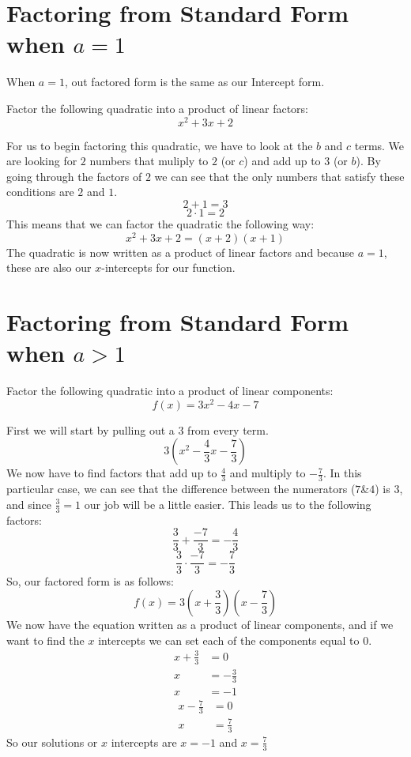 \documentclass{ximera}
\begin{document}
\section{Factoring from Standard Form when $a=1$}
When $a=1$, out factored form is the same as our Intercept form.

\begin{example}
Factor the following quadratic into a product of linear factors:
\[
x^2+3x+2
\]

\begin{explanation}
For us to begin factoring this quadratic, we have to look at the $b$ and $c$ terms. We are looking for $2$ numbers that muliply to $2$ (or $c$) and add up to $3$ (or $b$). By going through the factors of $2$ we can see that the only numbers that satisfy these conditions are $2$ and $1$.
\[
2+1=3
\]
\[
2\cdot 1=2
\]
This means that we can factor the quadratic the following way:
\[
x^2+3x+2=(x+2)(x+1)
\]
The quadratic is now written as a product of linear factors and because $a=1$, these are also our $x$-intercepts for our function.
\end{explanation}
\end{example}

\section{Factoring from Standard Form when $a>1$}
\begin{example}
Factor the following quadratic into a product of linear components:
\[
f(x)= 3x^2-4x-7
\]
\begin{explanation}
First we will start by pulling out a $3$ from every term.
\[
3(x^2-\frac{4}{3}x-\frac{7}{3})
\]
We now have to find factors that add up to $\frac{4}{3}$ and multiply to $-\frac{7}{3}$. In this particular case, we can see that the difference between the numerators ($7$\&$4$) is $3$, and since $\frac{3}{3}=1$ our job will be a little easier. This leads us to the following factors:
\[
\frac{3}{3}+\frac{-7}{3}=-\frac{4}{3}
\]
\[
\frac{3}{3}\cdot \frac{-7}{3}= -\frac{7}{3}
\]
So, our factored form is as follows:
\[
f(x) = 3(x+\frac{3}{3})(x-\frac{7}{3})
\]
We now have the equation written as a product of linear components, and if we want to find the $x$ intercepts we can set each of the components equal to $0$.
\begin{align*}
x+\frac{3}{3}&=0\\
x&=-\frac{3}{3}\\
x&=-1
\end{align*}
\begin{align*}
x-\frac{7}{3}&=0\\
x&=\frac{7}{3}
\end{align*}
So our solutions or $x$ intercepts are $x=-1$ and $x=\frac{7}{3}$
\end{explanation}
\end{example}
\end{document}
